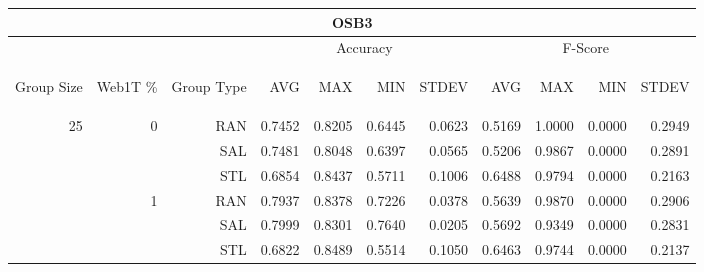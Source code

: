 \begin{center}
\begin{table}[htbp]
\begin{tabular}{ | r | r | r | r | r | r | r | r | r | r | r |}
\hline
\multicolumn{11}{|c|}{OSB3}\\
\hline
 & & & \multicolumn{4}{|c|}{Accuracy} & \multicolumn{4}{|c|}{F-Score}\\ \cline{4-11}
\begin{sideways}Group Size\end{sideways} & \begin{sideways}Web1T \%\end{sideways} & \begin{sideways}Group Type\end{sideways} & \begin{sideways}AVG\end{sideways} & \begin{sideways}MAX\end{sideways} & \begin{sideways}MIN\end{sideways} & \begin{sideways}STDEV\end{sideways} & \begin{sideways}AVG\end{sideways} & \begin{sideways}MAX\end{sideways} & \begin{sideways}MIN\end{sideways} & \begin{sideways}STDEV\end{sideways}\\
\hline
\multirow{18}{*}{25}
 & \multirow{3}{*}{0} & RAN & 0.7452 & 0.8205 & 0.6445 & 0.0623 & 0.5169 & 1.0000 & 0.0000 & 0.2949\\ \cline{3-11}
 &   & SAL & 0.7481 & 0.8048 & 0.6397 & 0.0565 & 0.5206 & 0.9867 & 0.0000 & 0.2891\\ \cline{3-11}
 &   & STL & 0.6854 & 0.8437 & 0.5711 & 0.1006 & 0.6488 & 0.9794 & 0.0000 & 0.2163\\ \cline{2-11}
 & \multirow{3}{*}{1} & RAN & 0.7937 & 0.8378 & 0.7226 & 0.0378 & 0.5639 & 0.9870 & 0.0000 & 0.2906\\ \cline{3-11}
 &   & SAL & 0.7999 & 0.8301 & 0.7640 & 0.0205 & 0.5692 & 0.9349 & 0.0000 & 0.2831\\ \cline{3-11}
 &   & STL & 0.6822 & 0.8489 & 0.5514 & 0.1050 & 0.6463 & 0.9744 & 0.0000 & 0.2137\\ \cline{2-11}

\end{tabular}
\end{table}
\end{center}
